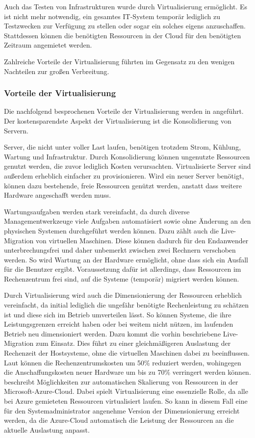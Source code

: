 Auch das Testen von Infrastrukturen wurde durch Virtualisierung ermöglicht.
Es ist nicht mehr notwendig, ein gesamtes IT-System temporär lediglich zu Testzwecken zur Verfügung zu stellen oder sogar ein solches eigens anzuschaffen.
Stattdessen können die benötigten Ressourcen in der Cloud für den benötigten Zeitraum angemietet werden.

Zahlreiche Vorteile der Virtualisierung führten im Gegensatz zu den wenigen Nachteilen zur großen Verbreitung.

\subsubsection{Vorteile der Virtualisierung}
Die nachfolgend besprochenen Vorteile der Virtualisierung werden in \autocite{Baun2009} angeführt.
Der kostensparendste Aspekt der Virtualisierung ist die Konsolidierung von Servern.

Server, die nicht unter voller Last laufen, benötigen trotzdem Strom, Kühlung, Wartung und Infrastruktur.
Durch Konsolidierung können ungenutzte Ressourcen genutzt werden, die zuvor lediglich Kosten verursachten.
Virtualisierte Server sind außerdem erheblich einfacher zu provisionieren.
Wird ein neuer Server benötigt, können dazu bestehende, freie Ressourcen genützt werden, anstatt dass weitere Hardware angeschafft werden muss.

Wartungsaufgaben werden stark vereinfacht, da durch diverse Managementwerkzeuge viele Aufgaben automatisiert sowie ohne Änderung an den physischen Systemen durchgeführt werden können.
Dazu zählt auch die Live-Migration von virtuellen Maschinen.
Diese können dadurch für den Endanwender unterbrechungsfrei und daher unbemerkt zwischen zwei Rechnern verschoben werden.
So wird Wartung an der Hardware ermöglicht, ohne dass sich ein Ausfall für die Benutzer ergibt.
Voraussetzung dafür ist allerdings, dass Ressourcen im Rechenzentrum frei sind, auf die Systeme (temporär) migriert werden können.

Durch Virtualisierung wird auch die Dimensionierung der Ressourcen erheblich vereinfacht, da initial lediglich die ungefähr benötigte Rechenleistung zu schätzen ist und diese sich im Betrieb umverteilen lässt.
So können Systeme, die ihre Leistungsgrenzen erreicht haben oder bei weitem nicht nützen, im laufenden Betrieb neu dimensioniert werden.
Dazu kommt die vorhin beschriebene Live-Migration zum Einsatz.
Dies führt zu einer gleichmäßigeren Auslastung der Rechenzeit der Hostsysteme, ohne die virtuellen Maschinen dabei zu beeinflussen.
Laut \autocite{Hantelmann2008} können die Rechenzentrumskosten um 50\% reduziert werden, wohingegen die Anschaffungskosten neuer Hardware um bis zu 70\% verringert werden können.
\autocite{Azure-Scaling:online} beschreibt Möglichkeiten zur automatischen Skalierung von Ressourcen in der Microsoft-Azure-Cloud.
Dabei spielt Virtualisierung eine essenzielle Rolle, da alle bei Azure gemieteten Ressourcen virtualisiert laufen.
So kann in diesem Fall eine für den Systemadministrator angenehme Version der Dimensionierung erreicht werden, da die Azure-Cloud automatisch die Leistung der Ressourcen an die aktuelle Auslastung anpasst.

